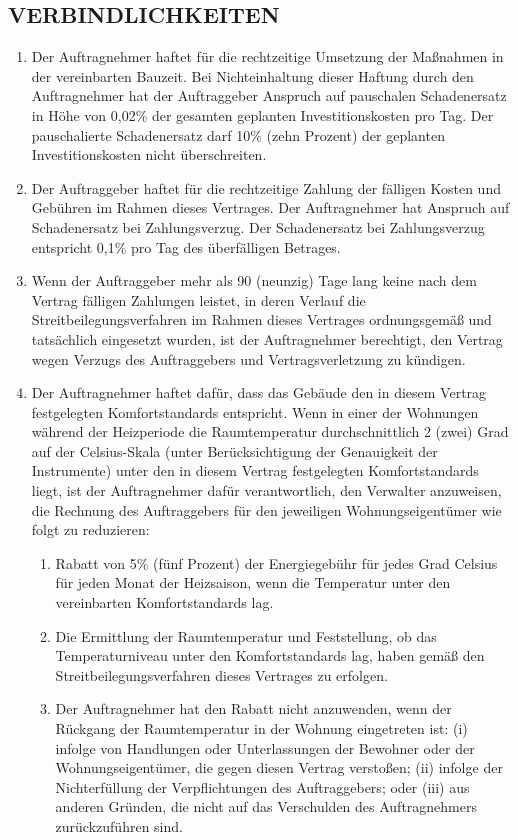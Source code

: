 \begin{multicols}{2}
   \subsection{VERBINDLICHKEITEN}
   \begin{enumerate}
   \item Der Auftragnehmer haftet für die rechtzeitige Umsetzung der Maßnahmen in der vereinbarten Bauzeit. Bei Nichteinhaltung dieser Haftung durch den Auftragnehmer hat der Auftraggeber Anspruch auf pauschalen Schadenersatz in Höhe von 0,02\% der gesamten geplanten Investitionskosten pro Tag. Der pauschalierte Schadenersatz darf 10\% (zehn Prozent) der geplanten Investitionskosten nicht überschreiten.
   \item Der Auftraggeber haftet für die rechtzeitige Zahlung der fälligen Kosten und Gebühren im Rahmen dieses Vertrages. Der Auftragnehmer hat Anspruch auf Schadenersatz bei Zahlungsverzug. Der Schadenersatz bei Zahlungsverzug entspricht 0,1\% pro Tag des überfälligen Betrages.
   \item Wenn der Auftraggeber mehr als 90 (neunzig) Tage lang keine nach dem Vertrag fälligen Zahlungen leistet, in deren Verlauf die Streitbeilegungsverfahren im Rahmen dieses Vertrages ordnungsgemäß und tatsächlich eingesetzt wurden, ist der Auftragnehmer berechtigt, den Vertrag wegen Verzugs des Auftraggebers und Vertragsverletzung zu kündigen.
   \item Der Auftragnehmer haftet dafür, dass das Gebäude den in diesem Vertrag festgelegten Komfortstandards entspricht. Wenn in einer der Wohnungen während der Heizperiode die Raumtemperatur durchschnittlich 2 (zwei) Grad auf der Celsius-Skala (unter Berücksichtigung der Genauigkeit der Instrumente) unter den in diesem Vertrag festgelegten Komfortstandards liegt, ist der Auftragnehmer dafür verantwortlich, den Verwalter anzuweisen, die Rechnung des Auftraggebers für den jeweiligen Wohnungseigentümer wie folgt zu reduzieren:
   \begin{enumerate}
   \item Rabatt von 5\% (fünf Prozent) der Energiegebühr für jedes Grad Celsius für jeden Monat der Heizsaison, wenn die Temperatur unter den vereinbarten Komfortstandards lag.
   \item Die Ermittlung der Raumtemperatur und Feststellung, ob das Temperaturniveau unter den Komfortstandards lag, haben gemäß den Streitbeilegungsverfahren dieses Vertrages zu erfolgen.
   \item Der Auftragnehmer hat den Rabatt nicht anzuwenden, wenn der Rückgang der Raumtemperatur in der Wohnung eingetreten ist: (i) infolge von Handlungen oder Unterlassungen der Bewohner oder der Wohnungseigentümer, die gegen diesen Vertrag verstoßen; (ii) infolge der Nichterfüllung der Verpflichtungen des Auftraggebers; oder (iii) aus anderen Gründen, die nicht auf das Verschulden des Auftragnehmers zurückzuführen sind.

\end{enumerate}
\end{enumerate}
\end{multicols}
